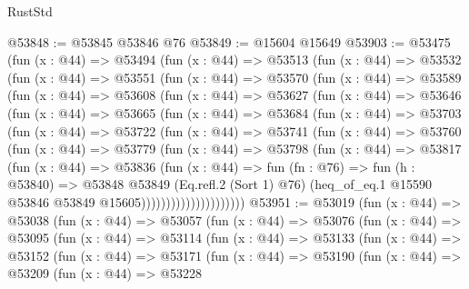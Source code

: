 \begin{lexlean}{RustStd}
\begin{coremodule}
@53848 := @53845 @53846 @76
@53849 := @15604 @15649
@53903 := @53475
    (fun (x : @44) =>
    @53494
      (fun (x : @44) =>
      @53513
        (fun (x : @44) =>
        @53532
          (fun (x : @44) =>
          @53551
            (fun (x : @44) =>
            @53570
              (fun (x : @44) =>
              @53589
                (fun (x : @44) =>
                @53608
                  (fun (x : @44) =>
                  @53627
                    (fun (x : @44) =>
                    @53646
                      (fun (x : @44) =>
                      @53665
                        (fun (x : @44) =>
                        @53684
                          (fun (x : @44) =>
                          @53703
                            (fun (x : @44) =>
                            @53722
                              (fun (x : @44) =>
                              @53741
                                (fun (x : @44) =>
                                @53760
                                  (fun (x : @44) =>
                                  @53779
                                    (fun (x : @44) =>
                                    @53798
                                      (fun (x : @44) =>
                                      @53817
                                        (fun (x : @44) =>
                                        @53836
                                          (fun (x : @44) =>
                                          fun (fn : @76) =>
                                          fun (h : @53840) =>
                                          @53848
                                            @53849
                                            (Eq.refl.{2} (Sort 1) @76)
                                            (heq_of_eq.{1}
                                              @15590
                                              @53846
                                              @53849
                                              @15605)))))))))))))))))))))
@53951 := @53019
    (fun (x : @44) =>
    @53038
      (fun (x : @44) =>
      @53057
        (fun (x : @44) =>
        @53076
          (fun (x : @44) =>
          @53095
            (fun (x : @44) =>
            @53114
              (fun (x : @44) =>
              @53133
                (fun (x : @44) =>
                @53152
                  (fun (x : @44) =>
                  @53171
                    (fun (x : @44) =>
                    @53190
                      (fun (x : @44) =>
                      @53209
                        (fun (x : @44) =>
                        @53228

\end{coremodule}
\end{lexlean}
